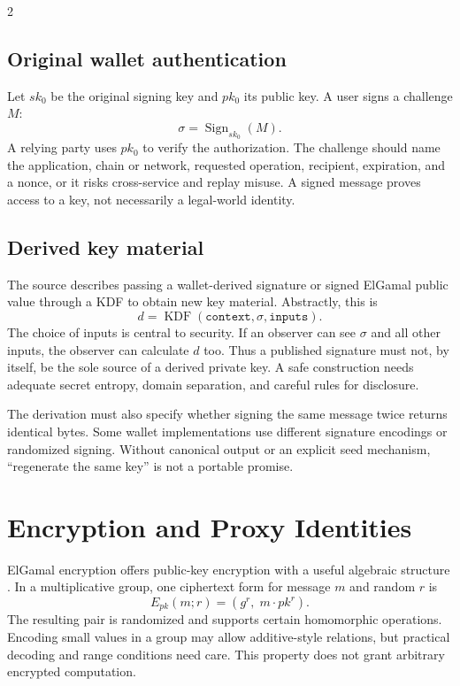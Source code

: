 \documentclass[10pt,letterpaper]{article}
\begin{document}
\begin{multicols}{2}
\subsection{Original wallet authentication}
Let $sk_0$ be the original signing key and $pk_0$ its public key. A user signs a challenge $M$:
\begin{equation}
 \sigma=\operatorname{Sign}_{sk_0}(M).
\end{equation}
A relying party uses $pk_0$ to verify the authorization. The challenge should name the application, chain or network, requested operation, recipient, expiration, and a nonce, or it risks cross-service and replay misuse. A signed message proves access to a key, not necessarily a legal-world identity.

\subsection{Derived key material}
The source describes passing a wallet-derived signature or signed ElGamal public value through a KDF to obtain new key material. Abstractly, this is
\begin{equation}
 d=\operatorname{KDF}(\texttt{context},\sigma,\texttt{inputs}).
\end{equation}
The choice of inputs is central to security. If an observer can see $\sigma$ and all other inputs, the observer can calculate $d$ too. Thus a published signature must not, by itself, be the sole source of a derived private key. A safe construction needs adequate secret entropy, domain separation, and careful rules for disclosure.

The derivation must also specify whether signing the same message twice returns identical bytes. Some wallet implementations use different signature encodings or randomized signing. Without canonical output or an explicit seed mechanism, ``regenerate the same key'' is not a portable promise.

\section{Encryption and Proxy Identities}
ElGamal encryption offers public-key encryption with a useful algebraic structure \cite{elgamal}. In a multiplicative group, one ciphertext form for message $m$ and random $r$ is
\begin{equation}
 E_{pk}(m;r)=(g^r,\;m\cdot pk^r).
\end{equation}
The resulting pair is randomized and supports certain homomorphic operations. Encoding small values in a group may allow additive-style relations, but practical decoding and range conditions need care. This property does not grant arbitrary encrypted computation.


\end{multicols}
\end{document}
